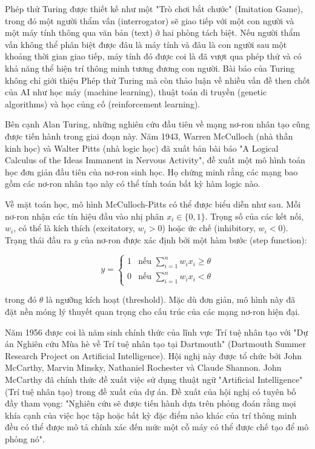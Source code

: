 Phép thử Turing được thiết kế như một "Trò chơi bắt chước" (Imitation Game), trong đó một người thẩm vấn (interrogator) sẽ giao tiếp với một con người và một máy tính thông qua văn bản (text) ở hai phòng tách biệt. Nếu người thẩm vấn không thể phân biệt được đâu là máy tính và đâu là con người sau một khoảng thời gian giao tiếp, máy tính đó được coi là đã vượt qua phép thử và có khả năng thể hiện trí thông minh tương đương con người. Bài báo của Turing không chỉ giới thiệu Phép thử Turing mà còn thảo luận về nhiều vấn đề then chốt của AI như học máy (machine learning), thuật toán di truyền (genetic algorithms) và học củng cố (reinforcement learning).

Bên cạnh Alan Turing, những nghiên cứu đầu tiên về mạng nơ-ron nhân tạo cũng được tiến hành trong giai đoạn này. Năm 1943, Warren McCulloch (nhà thần kinh học) và Walter Pitts (nhà logic học) đã xuất bản bài báo "A Logical Calculus of the Ideas Immanent in Nervous Activity", đề xuất một mô hình toán học đơn giản đầu tiên của nơ-ron sinh học. Họ chứng minh rằng các mạng bao gồm các nơ-ron nhân tạo này có thể tính toán bất kỳ hàm logic nào. 

Về mặt toán học, mô hình McCulloch-Pitts có thể được biểu diễn như sau. Mỗi nơ-ron nhận các tín hiệu đầu vào nhị phân $x_i \in \{0, 1\}$. Trọng số của các kết nối, $w_i$, có thể là kích thích (excitatory, $w_i > 0$) hoặc ức chế (inhibitory, $w_i < 0$). Trạng thái đầu ra $y$ của nơ-ron được xác định bởi một hàm bước (step function):

\begin{equation}
y = \begin{cases} 
1 & \text{nếu } \sum_{i=1}^{n} w_i x_i \geq \theta \\
0 & \text{nếu } \sum_{i=1}^{n} w_i x_i < \theta 
\end{cases}
\end{equation}

trong đó $\theta$ là ngưỡng kích hoạt (threshold). Mặc dù đơn giản, mô hình này đã đặt nền móng lý thuyết quan trọng cho cấu trúc của các mạng nơ-ron hiện đại.

Năm 1956 được coi là năm sinh chính thức của lĩnh vực Trí tuệ nhân tạo với "Dự án Nghiên cứu Mùa hè về Trí tuệ nhân tạo tại Dartmouth" (Dartmouth Summer Research Project on Artificial Intelligence). Hội nghị này được tổ chức bởi John McCarthy, Marvin Minsky, Nathaniel Rochester và Claude Shannon. John McCarthy đã chính thức đề xuất việc sử dụng thuật ngữ "Artificial Intelligence" (Trí tuệ nhân tạo) trong đề xuất của dự án. Đề xuất của hội nghị có tuyên bố đầy tham vọng: "Nghiên cứu sẽ được tiến hành dựa trên phỏng đoán rằng mọi khía cạnh của việc học tập hoặc bất kỳ đặc điểm nào khác của trí thông minh đều có thể được mô tả chính xác đến mức một cỗ máy có thể được chế tạo để mô phỏng nó". 

